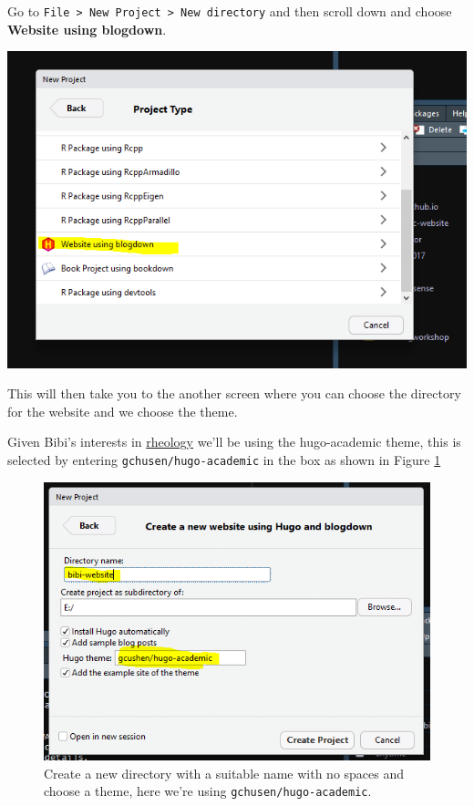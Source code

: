 \documentclass[12pt,]{book}
\theoremstyle{definition}
\theoremstyle{definition}
\theoremstyle{definition}
\theoremstyle{remark}
\begin{document}
Go to
\texttt{File\ \textgreater{}\ New\ Project\ \textgreater{}\ New\ directory}
and then scroll down and choose \textbf{Website using blogdown}.

\includegraphics[width=1.2\linewidth]{img/new_website}

This will then take you to the another screen where you can choose the
directory for the website and we choose the theme.

Given Bibi's interests in
\href{https://www.drgoulu.com/wp-content/uploads/2017/09/Rheology-of-cats.pdf}{rheology}
we'll be using the hugo-academic theme, this is selected by entering
\texttt{gchusen/hugo-academic} in the box as shown in Figure
\ref{fig:choose-theme}





\begin{figure}
\includegraphics[width=1.2\linewidth]{img/create-website} \caption{Create a new directory with a suitable name with no
spaces and choose a theme, here we're using
\texttt{gchusen/hugo-academic}.}\label{fig:choose-theme}
\end{figure}
\end{document}
